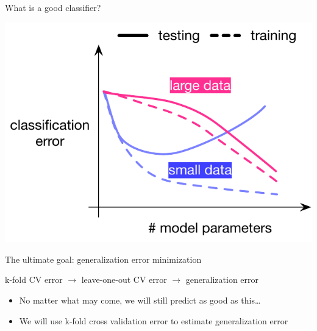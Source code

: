\documentclass[
  ignorenonframetext,
  aspectratio=169]{beamer}
\begin{document}
\begin{frame}{What is a good classifier?}
{\begin{center}\includegraphics[height=.7\textheight]{Vis/supervised_learning_curves_3} \end{center}


}

\normalsize
\end{frame}

\begin{frame}{The ultimate goal: generalization error minimization}
\protect\hypertarget{the-ultimate-goal-generalization-error-minimization}{}
\Large

k-fold CV error \(\to\) leave-one-out CV error \(\to\) generalization
error

\vfill

\normalsize

\begin{itemize}
\item
  No matter what may come, we will still predict as good as this\ldots{}
\item
  We will use k-fold cross validation error to estimate generalization
  error
\end{itemize}
\end{frame}
\end{document}
